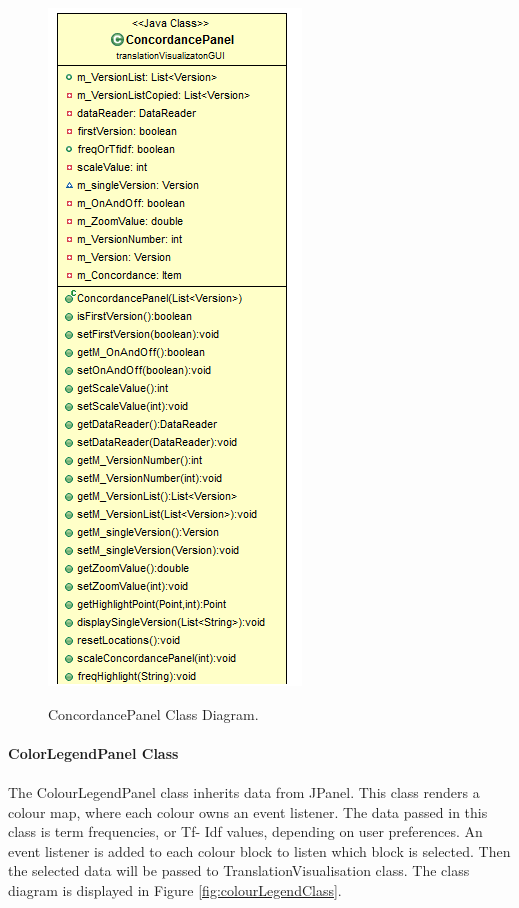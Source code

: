 	\begin{figure}[H]
	\centering    
	\includegraphics[scale=0.8]{Figs/ConcordancePanel-Class}\\[1ex]
	\caption{ConcordancePanel Class Diagram. }
	\label{fig:concordancePanelClass}
\end{figure}


\paragraph{ColorLegendPanel Class}
\paragraph[]{}The ColourLegendPanel class inherits data from JPanel. This class renders a colour map, where each colour owns an event listener. The data passed in this class is term frequencies, or Tf- Idf values, depending on user preferences. An event listener is added to each colour block to listen which block is selected. Then the selected data will be passed to TranslationVisualisation class. The class diagram is displayed in Figure \ref{fig:colourLegendClass}.

